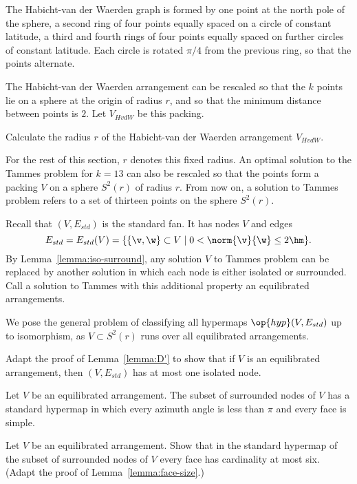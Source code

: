 The Habicht-van der Waerden graph is formed by one point at the north
pole of the sphere, a second ring of four points equally spaced on a
circle of constant latitude, a third and fourth rings of four points
equally spaced on further circles of constant latitude.  Each circle
is rotated $\pi/4$ from the previous ring, so that the points
alternate.

The Habicht-van der Waerden arrangement can be rescaled so that the
$k$ points lie on a sphere at the origin of radius $r$, and so that
the minimum distance between points is $2$.  Let $V_{HvdW}$ be this
packing.

\begin{exer}
Calculate the radius $r$ of the Habicht-van der Waerden arrangement $V_{HvdW}$.
\end{exer}

For the rest of this section, $r$ denotes this fixed radius.  An
optimal solution to the Tammes problem for $k=13$ can also be rescaled
so that the points form a packing $V$ on a sphere $S^2(r)$ of radius
$r$.  From now on, a solution to Tammes problem  refers to a set of
thirteen  points on the sphere $S^2(r)$.

Recall that $(V,E_{std})$ is the standard fan.  It has nodes $V$ and edges
\[
E_{std} = E_{std}(V) = \{\{\v,\w\}\subset V\mid 0 <
\norm{\v}{\w} \le 2\hm\}.
\]
By Lemma~\ref{lemma:iso-surround}, any solution $V$ to Tammes problem
can be replaced by another solution in which each node is either
isolated or surrounded.  Call a solution to Tammes
with this additional property an equilibrated arrangements.


We pose the general problem of classifying
all hypermaps $\op{hyp}(V,E_{std})$ up to isomorphism, as $V\subset
S^2(r)$ runs over all equilibrated arrangements.

\begin{exer}
  Adapt the proof of Lemma~\ref{lemma:D'} to show that if $V$ is an
  equilibrated arrangement, then $(V,E_{std})$ has at most one
  isolated node.
\end{exer}

Let $V$ be an equilibrated arrangement.   The subset
of surrounded nodes of $V$ has a standard hypermap in which every
azimuth angle is less than $\pi$ and every face is simple.

\begin{exer} 
  Let $V$ be an equilibrated arrangement.  Show that in the standard
  hypermap of the subset of surrounded nodes of $V$ every face has
  cardinality at most six.  (Adapt the proof of
  Lemma~\ref{lemma:face-size}.)
\end{exer}

